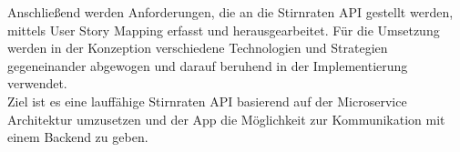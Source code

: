 Anschließend werden Anforderungen, die an die Stirnraten API gestellt werden, mittels User Story Mapping erfasst und herausgearbeitet. Für die Umsetzung werden in der Konzeption verschiedene Technologien und Strategien gegeneinander abgewogen und darauf beruhend in der Implementierung verwendet.\\ 

Ziel ist es eine lauffähige Stirnraten API basierend auf der Microservice Architektur umzusetzen und der App die Möglichkeit zur Kommunikation mit einem Backend zu geben. \\